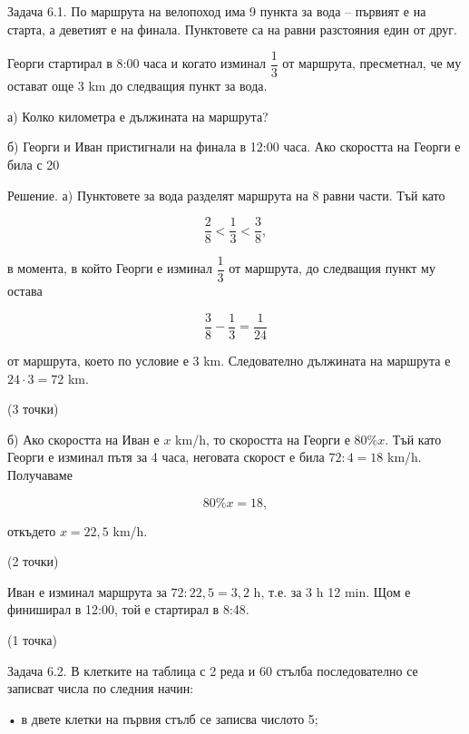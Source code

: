 
Задача 6.1. По маршрута на велопоход има 9 пункта за вода – първият е на старта, а деветият е на финала. Пунктовете са на равни разстояния един от друг.

Георги стартирал в 8:00 часа и когато изминал $\dfrac{1}{3}$ от маршрута, пресметнал, че му остават още 3 km до следващия пункт за вода.

а) Колко километра е дължината на маршрута?

б) Георги и Иван пристигнали на финала в 12:00 часа. Ако скоростта на Георги е била с 20%

Решение. а) Пунктовете за вода разделят маршрута на 8 равни части. Тъй като

$$\dfrac{2}{8}<\dfrac{1}{3}<\dfrac{3}{8},$$

в момента, в който Георги е изминал $\dfrac{1}{3}$ от маршрута, до следващия пункт му остава

$$\dfrac{3}{8}-\dfrac{1}{3}=\dfrac{1}{24}$$

от маршрута, което по условие е 3 km. Следователно дължината на маршрута е $24\cdot3=72$ km.

(3 точки)

б) Ако скоростта на Иван е $x$ km/h, то скоростта на Георги е $80\%x$. Тъй като Георги е изминал пътя за 4 часа, неговата скорост е била $72:4=18$ km/h. Получаваме

$$80\%x=18,$$

откъдето $x=22,5$ km/h.

(2 точки)

Иван е изминал маршрута за $72:22,5=3,2$ h, т.е. за 3 h 12 min. Щом е финиширал в 12:00, той е стартирал в 8:48.

(1 точка)

Задача 6.2. В клетките на таблица с 2 реда и 60 стълба последователно се записват числа по следния начин:

• в двете клетки на първия стълб се записва числото 5;

